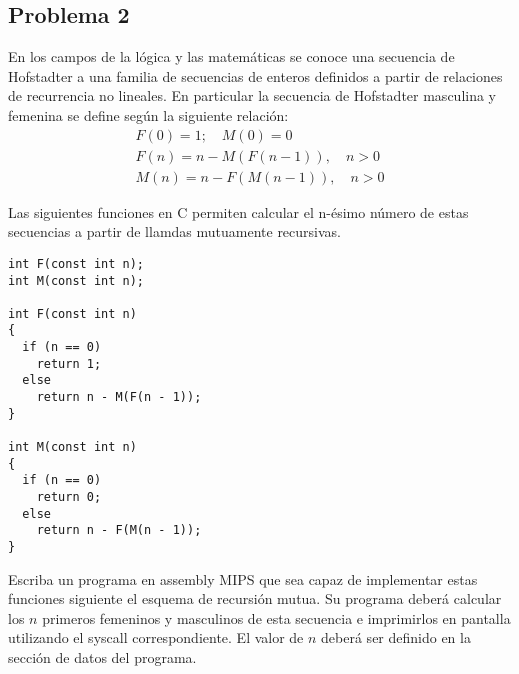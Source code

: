 \documentclass[letterpaper,11pt,notitlepage]{article}
\begin{document}
\subsection*{Problema 2}
En los campos de la lógica y las matemáticas se conoce una secuencia de Hofstadter a una familia de secuencias de enteros definidos a partir de relaciones de recurrencia no lineales. En particular  la secuencia de Hofstadter masculina y femenina se define según la siguiente relación:
\begin{eqnarray*}
  F(0) = 1; \quad M(0) = 0 \\
  F(n) = n - M(F(n-1)), \quad n>0\\
  M(n) = n - F(M(n-1)), \quad n>0
\end{eqnarray*}

Las siguientes funciones en C permiten calcular el n-ésimo número de estas secuencias a partir de llamdas mutuamente recursivas.
\begin{lstlisting}[style=C]
int F(const int n);
int M(const int n);
 
int F(const int n)
{
  if (n == 0)
    return 1;
  else
    return n - M(F(n - 1));
}
 
int M(const int n)
{
  if (n == 0)
    return 0;
  else
    return n - F(M(n - 1));
}
\end{lstlisting}     

Escriba un programa en assembly MIPS que sea capaz de implementar estas funciones siguiente el esquema de recursión mutua. Su programa deberá calcular los $n$ primeros femeninos y masculinos de esta secuencia e imprimirlos en pantalla utilizando el syscall correspondiente. El valor de $n$ deberá ser definido en la sección de datos del programa.
\end{document}
